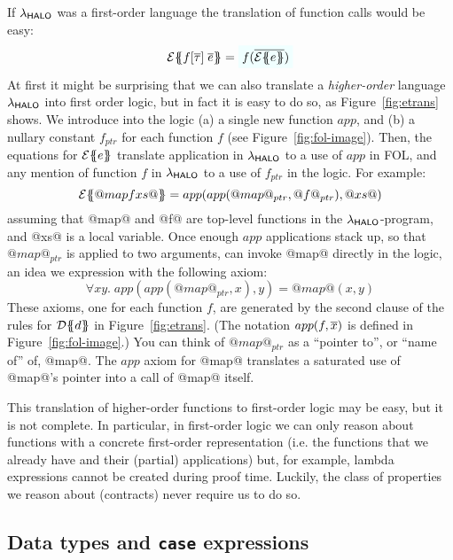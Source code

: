 If $\lambda_{\sf HALO}$ was
a first-order language the translation of function calls would be easy:
$$
\etrans{\Sigma}{\Gamma}{f[\ol{\tau}]\;\ol{e}} = \formula{f(\ol{\etrans{}{}{e}})} \\
$$
At first it might be surprising that we can also translate a \emph{higher-order} language
$\lambda_{\sf HALO}$ into first order logic, but in fact it is easy to do so, as
Figure~\ref{fig:etrans} shows.  We introduce into the logic
(a) a single new function $app$, and (b) a nullary constant $f_{ptr}$ for each function $f$
(see Figure~\ref{fig:fol-image}).
Then, the equations for ${\cal E}\{\!\!\{e\}\!\!\}$ translate application in $\lambda_{\sf HALO}$ to
a use of $app$ in FOL, and any mention of function $f$ in $\lambda_{\sf HALO}$ to a use
of $f_{ptr}$ in the logic.  For example:
$$
{\cal E}\{\!\!\{@map f xs@\}\!\!\} = app( app( @map@_{ptr}, @f@_{ptr}), @xs@)
$$
assuming that @map@ and @f@ are top-level functions in the $\lambda_{\sf HALO}$-program, and
@xs@ is a local variable.  Once enough $app$ applications stack up, so that
$@map@_{ptr}$ is applied to two arguments, can invoke @map@ directly in the logic,
an idea we expression with the following axiom:
$$
\forall x y.\;app(app(@map@_{ptr}, x), y) = @map@(x,y)
$$
These axioms, one for each function $f$, are generated by the second
clause of the rules for ${\cal D}\{\!\!\{d\}\!\!\}$ in Figure~\ref{fig:etrans}.
(The notation $app(f,\overline{x})$ is defined in Figure~\ref{fig:fol-image}.)
You can think of $@map@_{ptr}$ as a ``pointer to'', or ``name of'' of, @map@.
The $app$ axiom for @map@ translates a saturated use of @map@'s pointer into
a call of @map@ itself.

This translation of higher-order functions to first-order logic may be
easy, but it is not complete. In particular, in first-order logic we
can only reason about functions with a concrete first-order
representation (i.e. the functions that we already have and their
(partial) applications) but, for example, lambda expressions cannot be
created during proof time. Luckily, the class of properties we reason
about (contracts) never require us to do so.

\subsection{Data types and {\tt case} expressions} \label{s:case-fol}


